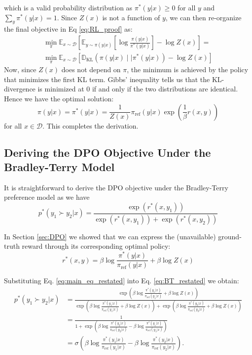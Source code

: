\documentclass{article}
\newcommand{\piref}{\pi_\text{ref}}
\begin{document}
which is a valid probability distribution as $\pi^*(y|x)\geq 0$ for all $y$ and $\sum_{y}\pi^*(y|x)=1$. Since $Z(x)$ is not a function of $y$, we can then re-organize the final objective in Eq \ref{eq:RL_proof} as:
\begin{align}
\min_{\pi}  \mathbb{E}_{x\sim \mathcal{D}}\left[\mathbb{E}_{y\sim \pi(y|x)}\left[\log\frac{\pi(y|x)}{\pi^*(y|x)}\right] - \log Z(x)\right]=\\
\min_{\pi}\mathbb{E}_{x\sim\mathcal{D}}\left[\mathbb{D}_{\text{KL}}(\pi(y|x)\mid\mid\pi^*(y|x)) - \log Z(x)\right]
\end{align}
Now, since $Z(x)$ does not depend on $\pi$, the minimum is achieved by the policy that minimizes the first KL term. Gibbs' inequality tells us that the KL-divergence is minimized at 0 if and only if the two distributions are identical. Hence we have the optimal solution:
\begin{equation}
    \pi(y|x)= \pi^*(y|x) = \frac{1}{Z(x)}\piref(y|x)\exp\left(\frac{1}{\beta}r(x, y)\right)
\end{equation}
for all $x\in\mathcal{D}$. This completes the derivation.

\label{app:derivation1}

\subsection{Deriving the DPO Objective Under the Bradley-Terry Model}
\label{app:derivation2}
It is straightforward to derive the DPO objective under the Bradley-Terry  preference model as we have
\begin{equation}\label{eq:BT_restated}
    p^*(y_1\succ y_2|x)=\frac{\exp\left(r^*(x, y_1)\right)}{\exp\left(r^*(x, y_1)\right) + \exp\left(r^*(x, y_2)\right)}
\end{equation}

In Section \ref{sec:DPO} we showed that we can express the (unavailable) ground-truth reward through its corresponding optimal policy:
\begin{equation}\label{eq:main_eq_restated}
    r^*(x,y) =\beta \log \frac{\pi^*(y|x)}{\piref(y|x)} + \beta \log Z(x)
\end{equation}

Substituting Eq. \ref{eq:main_eq_restated} into Eq. \ref{eq:BT_restated} we obtain:
\begin{align*}
    p^*(y_1\succ y_2|x)&=\frac{\exp\left(\beta \log \frac{\pi^*(y_1|x)}{\piref(y_1|x)} + \beta \log Z(x)\right)}{\exp\left(\beta \log \frac{\pi^*(y_1|x)}{\piref(y_1|x)} + \beta \log Z(x)\right) + \exp\left(\beta \log \frac{\pi^*(y_2|x)}{\piref(y_2|x)} + \beta \log Z(x)\right)}\\ &=
    \frac{1}{1+\exp\left(\beta \log \frac{\pi^*(y_2|x)}{\piref(y_2|x)}-\beta \log \frac{\pi^*(y_1|x)}{\piref(y_1|x)}\right)} \\&= \sigma\left(\beta \log \frac{\pi^*(y_1|x)}{\piref(y_1|x)} - \beta \log \frac{\pi^*(y_2|x)}{\piref(y_2|x)}\right).
\end{align*}
\end{document}
